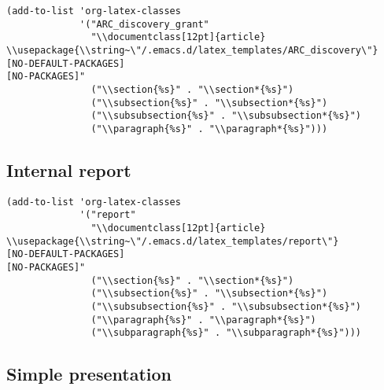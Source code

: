 \documentclass[12pt]{article}
\begin{document}
\lstset{language=Lisp,label= ,caption= ,captionpos=b,numbers=none}
\begin{lstlisting}
(add-to-list 'org-latex-classes
             '("ARC_discovery_grant"
               "\\documentclass[12pt]{article}
\\usepackage{\\string~\"/.emacs.d/latex_templates/ARC_discovery\"}
[NO-DEFAULT-PACKAGES]
[NO-PACKAGES]"
               ("\\section{%s}" . "\\section*{%s}")
               ("\\subsection{%s}" . "\\subsection*{%s}")
               ("\\subsubsection{%s}" . "\\subsubsection*{%s}")
               ("\\paragraph{%s}" . "\\paragraph*{%s}")))
\end{lstlisting}

\subsection{Internal report}
\label{sec:org611ee5f}
\lstset{language=Lisp,label= ,caption= ,captionpos=b,numbers=none}
\begin{lstlisting}
(add-to-list 'org-latex-classes
             '("report"
               "\\documentclass[12pt]{article}
\\usepackage{\\string~\"/.emacs.d/latex_templates/report\"}
[NO-DEFAULT-PACKAGES]
[NO-PACKAGES]"
               ("\\section{%s}" . "\\section*{%s}")
               ("\\subsection{%s}" . "\\subsection*{%s}")
               ("\\subsubsection{%s}" . "\\subsubsection*{%s}")
               ("\\paragraph{%s}" . "\\paragraph*{%s}")
               ("\\subparagraph{%s}" . "\\subparagraph*{%s}")))
\end{lstlisting}

\subsection{Simple presentation}
\label{sec:orgc0a2895}
\end{document}
